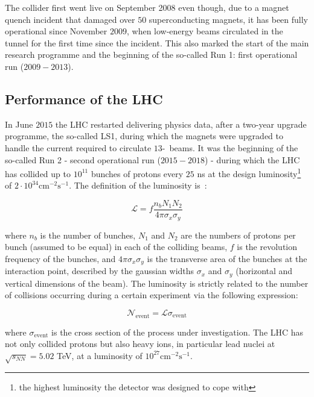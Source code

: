 		The collider first went live on September 2008 even though, due to a magnet quench incident that damaged over $50$ superconducting magnets, it has been fully operational since November $2009$, when low-energy beams circulated in the tunnel for the first time since the incident. This also marked the start of the main research programme and the beginning of the so-called Run 1: first operational run ($2009 - 2013$).


		\subsection*{Performance of the LHC}

			In June $2015$ the \ac{LHC} restarted delivering physics data, after a two-year upgrade programme, the so-called \ac{LS1}, during which the magnets were upgraded to handle the current required to circulate $13$-\TeV\ beams. It was the beginning of the so-called Run 2 - second operational run ($2015-2018$) - during which the \ac{LHC} has collided up to $10^{11}$ bunches of protons every $25$ ns at the design luminosity\footnote{the highest luminosity the detector was designed to cope with} of $2 \cdot 10^{34} \mathrm{cm}^{-2}\mathrm{s}^{-1}$. The definition of the luminosity is~\cite{Herr:941318}:

			\begin{equation}
				{\mathcal L} = f \frac{n_b N_1 N_2}{4 \pi \sigma_x \sigma_y}
			\label{eq:lumi}
			\end{equation}

			\noindent where $n_b$ is the number of bunches, $N_1$ and $N_2$ are the numbers of protons per bunch (assumed to be equal) in each of the colliding beams, $f$ is the revolution frequency of the bunches, and $4\pi \sigma_x \sigma_y$ is the transverse area of the bunches at the interaction point, described by the gaussian widths $\sigma_x$ and $\sigma_y$ (horizontal and vertical dimensions of the beam). The luminosity is strictly related to the number of collisions occurring during a certain experiment via the following expression: 

			\begin{equation}
					{\mathcal N}_{\mathrm{event}} = {\mathcal L} \sigma_{\mathrm{event}}
			\label{eq:lumiEvt}
			\end{equation}

			\noindent where $\sigma_{\mathrm{event}}$ is the cross section of the process under investigation. The \acs{LHC} has not only collided protons but also heavy ions, in particular lead nuclei at $\sqrt{s_{NN}} = 5.02$ TeV, at a luminosity of $10^{27} \mathrm{cm}^{-2} \mathrm{s}^{-1}$\cite{HI2015}.



